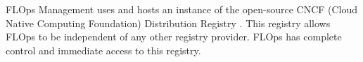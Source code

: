 FLOps Management uses and hosts an instance of the open-source CNCF (Cloud Native Computing Foundation) Distribution Registry \cite{docs:cncf_distribution_registry}.
This registry allows FLOps to be independent of any other registry provider.
FLOps has complete control and immediate access to this registry.
